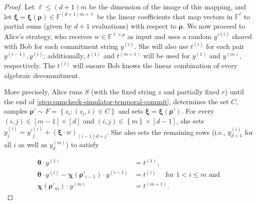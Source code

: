 \documentclass[a4paper,UKenglish,cleveref, autoref, thm-restate]{lipics-v2021}
\theoremstyle{definition}
\newcommand{\field}{\mathbb{F}}
\renewcommand{\set}[1]{\left\{#1\right\}}
\newcommand{\vcommitstring}{z}
\newcommand{\pcommitlength}{p}
\newcommand{\pcommitstring}{y}
\newcommand{\dimension}{m}
\newcommand{\degree}{d}
\newcommand{\fingerprinttuple}{\bm{\rho}}
\begin{document}
\begin{proof}
    Let $\ell \leq (\degree + 1) \dimension$ be the dimension of the image of this mapping, and let $\bm{\xi} = \bm{\xi}(\fingerprinttuple) \in \field^{(\degree + 1)\dimension \times \ell}$ be the linear coefficients that map vectors in $\field^\ell$ to partial sums (given by $\degree + 1$ evaluations) with respect to $\fingerprinttuple$. We now proceed to Alice's strategy, who receives $w \in \field^{\ell \times \pcommitlength}$ as input and uses a random $\pcommitstring'^{(i)}$ shared with Bob for each commitment string $\pcommitstring^{(i)}$. She will also use $t^{(i)}$ for each pair $\pcommitstring^{(i-1)}, \pcommitstring^{(i)}$; additionally, $t^{(1)}$ and $t^{(\dimension + 1)}$ will be used for $\pcommitstring^{(1)}$ and $\pcommitstring^{(\dimension)}$, respectively. The $t^{(i)}$ will ensure Bob knows the linear combination of every algebraic decommitment.
    
    More precisely, Alice runs $S$ (with the fixed string $\vcommitstring$ and partially fixed $r$) until the end of \cref{step:sumcheck-simulator-temporal-commit}, determines the set $C$, samples $\fingerprinttuple' \sim F = \set{\vcommitstring_i : (\vcommitstring_i, i) \in C}$ and sets $\bm{\xi} = \bm{\xi}(\fingerprinttuple')$. For every $(i, j) \in [\dimension - 1] \times [\degree]$ and $(i, j) \in \set{\dimension} \times [\degree - 1]$, she sets $\pcommitstring^{(i)}_j = \pcommitstring'^{(i)}_j + \left(\bm{\xi} \cdot w\right)_{(i-1)\degree + j}$. She also sets the remaining rows (i.e., $\pcommitstring^{(i)}_{\degree + 1}$ for all $i$ as well as $\pcommitstring^{(\dimension)}_\degree$) to satisfy
    
    \begin{align*}
        \bm{\theta} \cdot \pcommitstring^{(1)} &= t^{(1)},\\
        \bm{\theta} \cdot \pcommitstring^{(i)} - \bm{\chi}(\fingerprinttuple'_{i-1}) \cdot \pcommitstring^{(i-1)} &= t^{(i)} \quad\text{ for } 1 < i \leq \dimension \text { and}\\
        \bm{\chi}(\fingerprinttuple'_\dimension) \cdot \pcommitstring^{(\dimension)} &= t^{(\dimension+1)}.
    \end{align*}
    

\end{proof}
\end{document}
